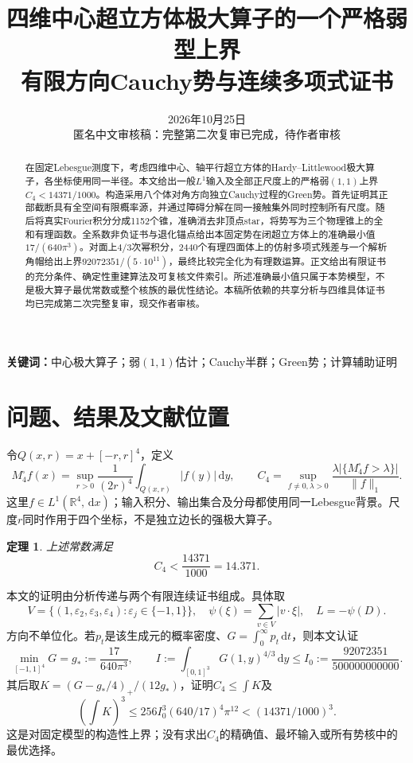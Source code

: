 \documentclass[UTF8,11pt,a4paper,fontset=fandol]{ctexart}
\title{四维中心超立方体极大算子的一个严格弱型上界\\\large 有限方向Cauchy势与连续多项式证书}
\author{}
\date{2026年10月25日\\\normalsize 匿名中文审核稿：完整第二次复审已完成，待作者审核}
\newtheorem{theorem}{定理}[section]
\theoremstyle{remark}\newtheorem{remark}[theorem]{注}
\newcommand{\R}{\mathbb R}\newcommand{\dd}{\,\mathrm d}
\newcommand{\1}{\mathbf1}\newcommand{\pos}[1]{(#1)_+}
\begin{document}
\maketitle
\begin{abstract}
在固定Lebesgue测度下，考虑四维中心、轴平行超立方体的Hardy--Littlewood极大算子，各坐标使用同一半径。本文给出一般$L^1$输入及全部正尺度上的严格弱$(1,1)$上界$C_4<14371/1000$。构造采用八个体对角方向独立Cauchy过程的Green势。首先证明其正部截断具有全空间有限概率源，并通过障碍分解在同一接触集外同时控制所有尺度。随后将真实Fourier积分分成1152个锥，准确消去非顶点star，将势写为三个物理锥上的全和有理函数。全系数非负证书与退化锚点给出本固定势在闭超立方体上的准确最小值$17/(640\pi^3)$。对面上$4/3$次幂积分，2440个有理四面体上的仿射多项式残差与一个解析角帽给出上界$92072351/(5\cdot10^{11})$，最终比较完全化为有理数运算。正文给出有限证书的充分条件、确定性重建算法及可复核文件索引。所述准确最小值只属于本势模型，不是极大算子最优常数或整个核族的最优性结论。本稿所依赖的共享分析与四维具体证书均已完成第二次完整复审，现交作者审核。
\end{abstract}
\noindent\textbf{关键词：}中心极大算子；弱$(1,1)$估计；Cauchy半群；Green势；计算辅助证明
\tableofcontents

\section{问题、结果及文献位置}
令$Q(x,r)=x+[-r,r]^4$，定义
\[
 M^\square_4f(x)=\sup_{r>0}\frac1{(2r)^4}\int_{Q(x,r)}|f(y)|\dd y,
 \qquad
 C_4=\sup_{f\ne0,\lambda>0}
 \frac{\lambda|\{M^\square_4f>\lambda\}|}{\|f\|_1}.
\]
这里$f\in L^1(\R^4,\dd x)$；输入积分、输出集合及分母都使用同一Lebesgue背景。尺度$r$同时作用于四个坐标，不是独立边长的强极大算子。

\begin{theorem}\label{thm:main}
上述常数满足
\[ C_4<\frac{14371}{1000}=14.371. \]
\end{theorem}
本文的证明由分析传递与两个有限连续证书组成。具体取
\[
 V=\{(1,\varepsilon_2,\varepsilon_3,\varepsilon_4):\varepsilon_j\in\{-1,1\}\},
 \quad\psi(\xi)=\sum_{v\in V}|v\cdot\xi|,\quad L=-\psi(D).
\]
方向不单位化。若$p_t$是该生成元的概率密度、$G=\int_0^\infty p_t\dd t$，则本文认证
\begin{equation}\label{eq:inputs}
 \min_{[-1,1]^4}G=g_*:=\frac{17}{640\pi^3},\qquad
 I:=\int_{[0,1]^3}G(1,y)^{4/3}\dd y\le I_0:=\frac{92072351}{500000000000}.
\end{equation}
其后取$K=(G-g_*/4)_+/(12g_*)$，证明$C_4\le\int K$及
\begin{equation}\label{eq:costsummary}
 (\int K)^3\le256 I_0^3(640/17)^4\pi^{12}<(14371/1000)^3.
\end{equation}
这是对固定模型的构造性上界；没有求出$C_4$的精确值、最坏输入或所有势核中的最优选择。
\end{document}

